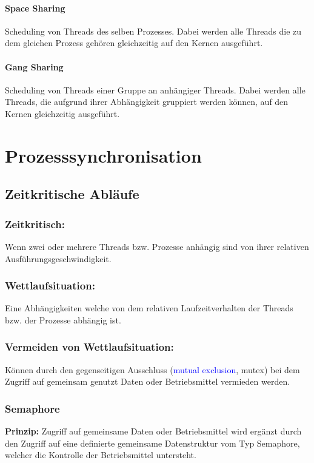 \documentclass[10pt,a4paper]{article}
\begin{document}
\begin{multicols*}{4}
\paragraph{Space Sharing} Scheduling von Threads des selben Prozesses. Dabei werden alle Threads die zu dem gleichen
Prozess gehören gleichzeitig auf den Kernen ausgeführt.
\paragraph{Gang Sharing} Scheduling von Threads einer Gruppe an anhängiger Threads. Dabei werden alle Threads, die
aufgrund ihrer Abhängigkeit gruppiert werden können, auf den Kernen gleichzeitig ausgeführt.
\section{Prozesssynchronisation}
\subsection{Zeitkritische Abläufe}

\subsubsection*{Zeitkritisch:}
Wenn zwei oder mehrere Threads bzw. Prozesse anhängig sind von ihrer relativen Ausführungsgeschwindigkeit.

\subsubsection*{Wettlaufsituation:}
Eine Abhängigkeiten welche von dem relativen Laufzeitverhalten der Threads bzw. der Prozesse abhängig ist.

\subsubsection*{Vermeiden von Wettlaufsituation:}
Können durch den gegenseitigen Ausschluss (\textcolor{blue}{mutual exclusion}, mutex) bei dem Zugriff auf gemeinsam
genutzt Daten oder Betriebsmittel vermieden werden.

\subsubsection{Semaphore}
\textbf{Prinzip:} Zugriff auf gemeinsame Daten oder Betriebsmittel wird ergänzt durch den Zugriff auf eine
definierte gemeinsame Datenstruktur vom Typ Semaphore, welcher die Kontrolle der Betriebsmittel untersteht.


\end{multicols*}
\end{document}
